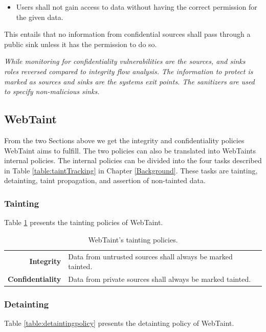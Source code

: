 \hfill
\begin{itemize}
    \item Users shall not gain access to data without having the correct permission for the given data.
\end{itemize}
\hfill

This entails that no information from confidential sources shall pass through a public sink unless it has the permission to do so.

\textit{While monitoring for confidentiality vulnerabilities are the sources, and sinks roles reversed compared to integrity flow analysis. The information to protect is marked as sources and sinks are the systems exit points. The sanitizers are used to specify non-malicious sinks.}



\subsection{WebTaint}
From the two Sections above we get the integrity and confidentiality policies WebTaint aims to fulfill. The two policies can also be translated into WebTaints internal policies. The internal policies can be divided into the four tasks described in Table \ref{table:taintTracking} in Chapter \ref{Background}. These tasks are tainting, detainting, taint propagation, and assertion of non-tainted data.



\subsubsection{Tainting}
Table \ref{table:taintingpolicy} presents the tainting policies of WebTaint.

\begin{table}[H]
    \centering
    \caption{WebTaint's tainting policies.}
    \label{table:taintingpolicy}
    \begin{tabular}{rp{8.5cm}}
        \textbf{Integrity} & Data from untrusted sources shall always be marked tainted. \\
        \textbf{Confidentiality} & Data from private sources shall always be marked tainted. \\         
    \end{tabular}
\end{table}



\subsubsection{Detainting}
Table \ref{table:detaintingpolicy} presents the detainting policy of WebTaint.


